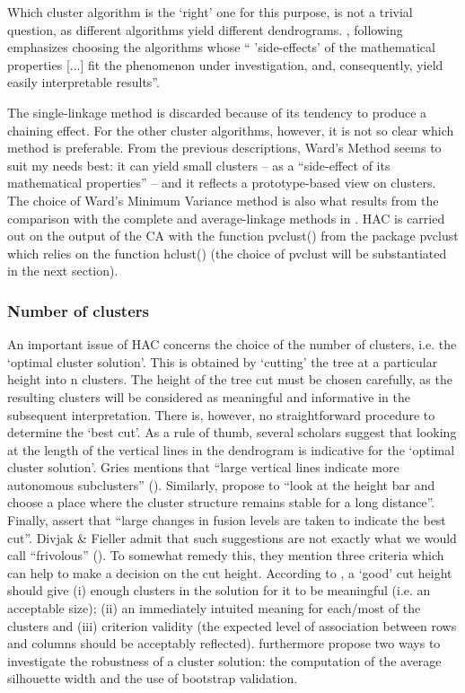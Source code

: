Which cluster algorithm is the ‘right’ one for this purpose, is not a trivial question, as different algorithms yield different dendrograms. \citet[132]{divjak_structuring_2010}, following \citet[35]{speece_cluster_1994} emphasizes choosing the algorithms whose “ 'side-effects' of the mathematical properties [...] fit the phenomenon under investigation, and, consequently, yield easily interpretable results”. 

The single-linkage method is discarded because of its tendency to produce a chaining effect. For the other cluster algorithms, however, it is not so clear which method is preferable. From the previous descriptions, Ward’s Method seems to suit my needs best: it can yield small clusters – as a “side-effect of its mathematical properties” – and it reflects a prototype-based view on clusters. The choice of Ward’s Minimum Variance method is also what results from the comparison with the complete and average-linkage methods in . HAC is carried out on the output of the CA with the function pvclust() from the package pvclust which relies on the function hclust() (the choice of pvclust will be substantiated in the next section).

\subsubsection{Number of clusters}
\label{sec:3.7.2.3} 
An important issue of HAC concerns the choice of the number of clusters, i.e. the ‘optimal cluster solution’. This is obtained by ‘cutting’ the tree at a particular height into n clusters. The height of the tree cut must be chosen carefully, as the resulting clusters will be considered as meaningful and informative in the subsequent interpretation. There is, however, no straightforward procedure to determine the ‘best cut’. As a rule of thumb, several scholars suggest that looking at the length of the vertical lines in the dendrogram is indicative for the ‘optimal cluster solution’. Gries mentions that “large vertical lines indicate more autonomous subclusters” (\citeyear[338]{gries_statistics_2013}). Similarly, \citet[430]{glynn_cluster_2014} propose to “look at the height bar and choose a place where the cluster structure remains stable for a long distance”. Finally, \citet[95]{everitt_cluster_2011} assert that “large changes in fusion levels are taken to indicate the best cut”. Divjak \& Fieller admit that such suggestions are not exactly what we would call “frivolous” (\citeyear[430]{glynn_cluster_2014}). To somewhat remedy this, they mention three criteria which can help to make a decision on the cut height. According to \citet[432--433]{glynn_cluster_2014}, a ‘good’ cut height should give (i) enough clusters in the solution for it to be meaningful (i.e. an acceptable size); (ii) an immediately intuited meaning for each/most of the clusters and (iii) criterion validity (the expected level of association between rows and columns should be acceptably reflected). \citet[432--433]{glynn_cluster_2014} furthermore propose two ways to investigate the robustness of a cluster solution: the computation of the average silhouette width and the use of bootstrap validation.

